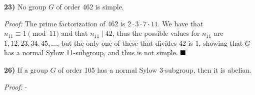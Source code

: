 \documentclass[12pt]{article}
\newcommand{\proof}{\textit{Proof: }}
\newcommand{\done}{\ensuremath{\strut\hfill\blacksquare}}
\begin{document}
\textbf{23)}
No group \( G \) of order 462 is simple.

\proof
The prime factorization of 462 is \( 2 \cdot 3 \cdot 7 \cdot 11 \).
We have that \( n_{11} \equiv 1 \pmod{11} \) and that
\( n_{11} \mid 42 \), thus the possible values for
\( n_{11} \) are \( 1, 12, 23, 34, 45, \dots \), but the only one of these
that divides 42 is 1, showing that \( G \) has a normal Sylow 11-subgroup, and
thus is not simple.
\done

\textbf{26)}
If a group \( G \) of order 105 has a normal Sylow 3-subgroup, then it is
abelian.

\proof
-
\end{document}
